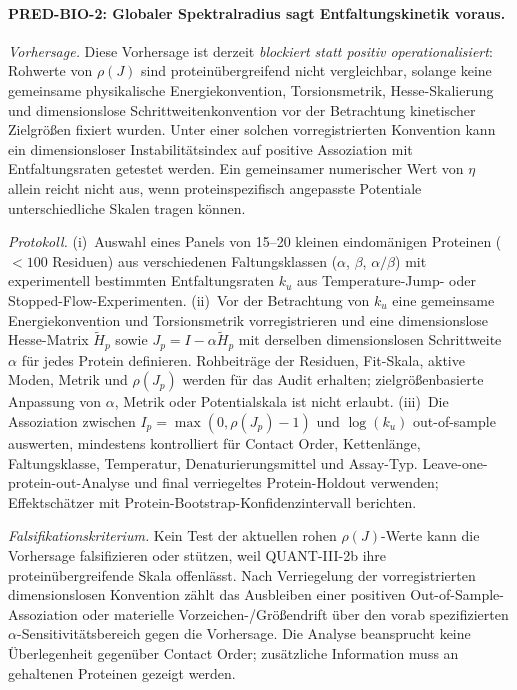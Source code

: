 \documentclass[12pt,a4paper]{article}
\theoremstyle{remark}
\begin{document}
\paragraph{PRED-BIO-2: Globaler Spektralradius sagt Entfaltungskinetik voraus.}

\textit{Vorhersage.}
Diese Vorhersage ist derzeit \emph{blockiert statt positiv operationalisiert}: Rohwerte von $\rho(J)$ sind proteinübergreifend nicht vergleichbar, solange keine gemeinsame physikalische Energiekonvention, Torsionsmetrik, Hesse-Skalierung und dimensionslose Schrittweitenkonvention vor der Betrachtung kinetischer Zielgrößen fixiert wurden. Unter einer solchen vorregistrierten Konvention kann ein dimensionsloser Instabilitätsindex auf positive Assoziation mit Entfaltungsraten getestet werden. Ein gemeinsamer numerischer Wert von $\eta$ allein reicht nicht aus, wenn proteinspezifisch angepasste Potentiale unterschiedliche Skalen tragen können.

\textit{Protokoll.}
(i)~Auswahl eines Panels von 15--20 kleinen eindomänigen Proteinen ($< 100$ Residuen) aus verschiedenen Faltungsklassen ($\alpha$, $\beta$, $\alpha/\beta$) mit experimentell bestimmten Entfaltungsraten $k_u$ aus Temperature-Jump- oder Stopped-Flow-Experimenten.
(ii)~Vor der Betrachtung von $k_u$ eine gemeinsame Energiekonvention und Torsionsmetrik vorregistrieren und eine dimensionslose Hesse-Matrix $\widetilde H_p$ sowie $J_p=I-\alpha\widetilde H_p$ mit derselben dimensionslosen Schrittweite $\alpha$ für jedes Protein definieren. Rohbeiträge der Residuen, Fit-Skala, aktive Moden, Metrik und $\rho(J_p)$ werden für das Audit erhalten; zielgrößenbasierte Anpassung von $\alpha$, Metrik oder Potentialskala ist nicht erlaubt.
(iii)~Die Assoziation zwischen $I_p=\max(0,\rho(J_p)-1)$ und $\log(k_u)$ out-of-sample auswerten, mindestens kontrolliert für Contact Order, Kettenlänge, Faltungsklasse, Temperatur, Denaturierungsmittel und Assay-Typ. Leave-one-protein-out-Analyse und final verriegeltes Protein-Holdout verwenden; Effektschätzer mit Protein-Bootstrap-Konfidenzintervall berichten.

\textit{Falsifikationskriterium.}
Kein Test der aktuellen rohen $\rho(J)$-Werte kann die Vorhersage falsifizieren oder stützen, weil QUANT-III-2b ihre proteinübergreifende Skala offenlässt. Nach Verriegelung der vorregistrierten dimensionslosen Konvention zählt das Ausbleiben einer positiven Out-of-Sample-Assoziation oder materielle Vorzeichen-/Größendrift über den vorab spezifizierten $\alpha$-Sensitivitätsbereich gegen die Vorhersage. Die Analyse beansprucht keine Überlegenheit gegenüber Contact Order; zusätzliche Information muss an gehaltenen Proteinen gezeigt werden.
\end{document}
